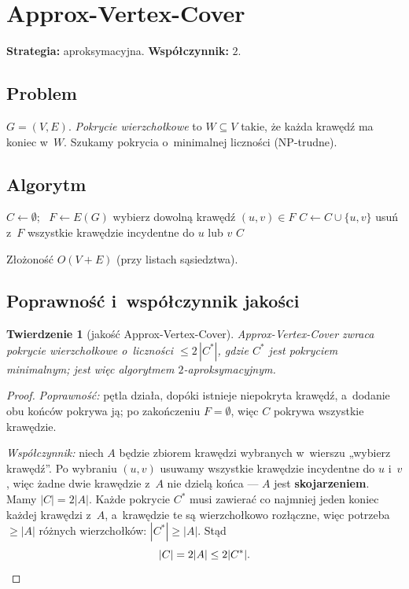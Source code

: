 \documentclass[11pt,a4paper]{article}
\theoremstyle{plain}
\newtheorem{twierdzenie}{Twierdzenie}[section]
\theoremstyle{definition}
\begin{document}
\section{Approx-Vertex-Cover}\label{sec:vc}
\textbf{Strategia:} aproksymacyjna. \quad\textbf{Współczynnik:} $2$.

\subsection*{Problem}
$G=(V,E)$. \emph{Pokrycie wierzchołkowe} to $W\subseteq V$ takie, że każda krawędź ma koniec w~$W$.
Szukamy pokrycia o~minimalnej liczności (NP\hbox{-}trudne).

\subsection*{Algorytm}
\begin{algorithm}[H]
\caption{Approx-Vertex-Cover($G$)}
\begin{algorithmic}[1]
\State $C\gets\emptyset$; \ $F\gets E(G)$
  \State wybierz dowolną krawędź $(u,v)\in F$
  \State $C\gets C\cup\{u,v\}$
  \State usuń z~$F$ wszystkie krawędzie incydentne do $u$ lub $v$
\EndWhile
\State \Return $C$
\end{algorithmic}
\end{algorithm}
Złożoność $O(V+E)$ (przy listach sąsiedztwa).

\subsection*{Poprawność i~współczynnik jakości}
\begin{twierdzenie}[jakość Approx-Vertex-Cover]\label{tw:vc}
Approx-Vertex-Cover zwraca pokrycie wierzchołkowe o~liczności $\le 2\,|C^\ast|$, gdzie $C^\ast$ jest
pokryciem minimalnym; jest więc algorytmem $2$-aproksymacyjnym.
\end{twierdzenie}
\begin{proof}
\emph{Poprawność:} pętla działa, dopóki istnieje niepokryta krawędź, a~dodanie obu końców pokrywa ją;
po zakończeniu $F=\emptyset$, więc $C$ pokrywa wszystkie krawędzie.

\emph{Współczynnik:} niech $A$ będzie zbiorem krawędzi wybranych w~wierszu „wybierz krawędź''. Po wybraniu
$(u,v)$ usuwamy wszystkie krawędzie incydentne do $u$ i~$v$, więc żadne dwie krawędzie z~$A$ nie dzielą
końca --- $A$ jest \textbf{skojarzeniem}. Mamy $|C|=2|A|$. Każde pokrycie $C^\ast$ musi zawierać co najmniej
jeden koniec każdej krawędzi z~$A$, a~krawędzie te są wierzchołkowo rozłączne, więc potrzeba $\ge|A|$
różnych wierzchołków: $|C^\ast|\ge|A|$. Stąd
\[
|C|=2|A|\le 2|C^\ast|. \qedhere
\]
\end{proof}
\end{document}
